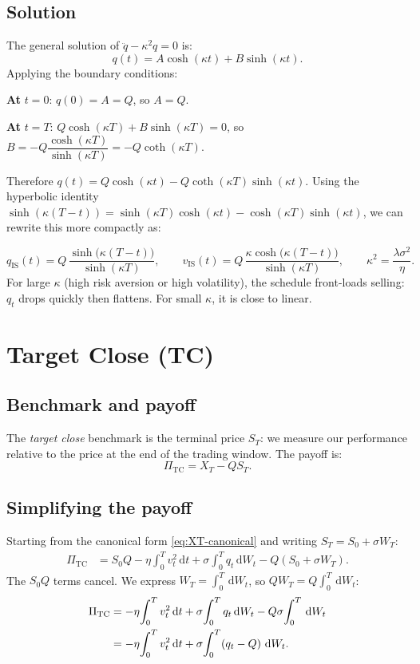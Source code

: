 \documentclass[12pt, a4paper]{article}
\newcommand{\dd}{\,\mathrm{d}}
\newcommand{\kap}{\kappa}
\begin{document}
\subsection{Solution}

The general solution of $\ddot q - \kap^2 q = 0$ is:
\[
  q(t) = A\cosh(\kap t) + B\sinh(\kap t).
\]
Applying the boundary conditions:

\textbf{At} $t = 0$: $q(0) = A = Q$, so $A = Q$.

\textbf{At} $t = T$: $Q\cosh(\kap T) + B\sinh(\kap T) = 0$, so
$B = -Q\dfrac{\cosh(\kap T)}{\sinh(\kap T)} = -Q\coth(\kap T)$.

Therefore $q(t) = Q\cosh(\kap t) - Q\coth(\kap T)\sinh(\kap t)$.
Using the hyperbolic identity
$\sinh(\kap(T-t)) = \sinh(\kap T)\cosh(\kap t) - \cosh(\kap T)\sinh(\kap t)$,
we can rewrite this more compactly as:

\begin{resultbox}
\[
  q_{\mathrm{IS}}(t) = Q\,\frac{\sinh\!\bigl(\kap(T-t)\bigr)}{\sinh(\kap T)},
  \qquad
  v_{\mathrm{IS}}(t) = Q\,\frac{\kap\cosh\!\bigl(\kap(T-t)\bigr)}{\sinh(\kap T)},
  \qquad \kap^2 = \frac{\lambda\sigma^2}{\eta}.
\]
For large $\kap$ (high risk aversion or high volatility), the schedule front-loads
selling: $q_t$ drops quickly then flattens. For small $\kap$, it is close to linear.
\end{resultbox}

\section{Target Close (TC)}
\label{sec:TC}

\subsection{Benchmark and payoff}

The \emph{target close} benchmark is the terminal price $S_T$: we measure our
performance relative to the price at the end of the trading window. The payoff is:
\[
  \Pi_{\mathrm{TC}} = X_T - QS_T.
\]

\subsection{Simplifying the payoff}

Starting from the canonical form \eqref{eq:XT-canonical} and writing
$S_T = S_0 + \sigma W_T$:
\begin{align*}
  \Pi_{\mathrm{TC}}
  &= S_0 Q - \eta\!\int_0^T v_t^2 \dd t + \sigma\!\int_0^T q_t \dd W_t
     - Q(S_0 + \sigma W_T).
\end{align*}
The $S_0 Q$ terms cancel. We express $W_T = \int_0^T \dd W_t$, so $QW_T = Q\int_0^T \dd W_t$:
\begin{align}
  \Pi_{\mathrm{TC}}
  &= - \eta\!\int_0^T v_t^2 \dd t + \sigma\!\int_0^T q_t \dd W_t
     - Q\sigma\!\int_0^T \dd W_t \notag\\
  &= - \eta\!\int_0^T v_t^2 \dd t + \sigma\!\int_0^T (q_t - Q)\,\dd W_t.
  \label{eq:PiTC}
\end{align}
\end{document}
